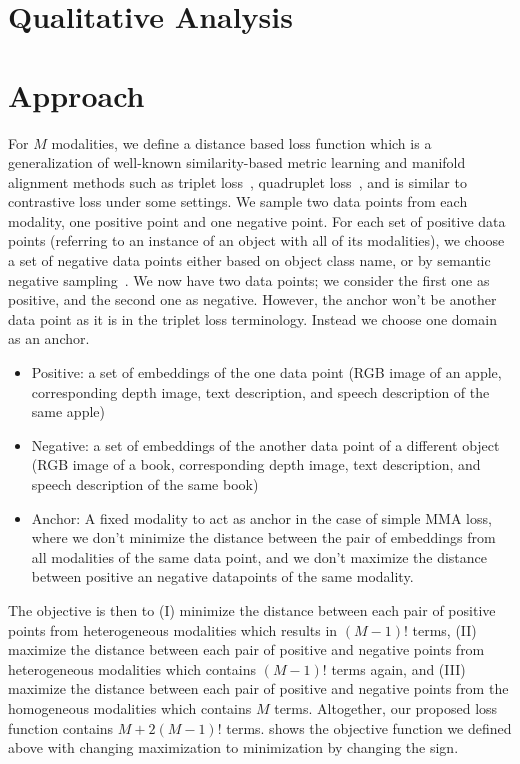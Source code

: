 
\section{Qualitative Analysis}
\section{Approach}

For $M$ modalities, we define a distance based loss function which is a generalization of well-known similarity-based metric learning and manifold alignment methods such as triplet loss~\cite{Carvalho-cooking-triplet,triplet_loss_2021_CVPR}, quadruplet loss~\cite{chen2017beyond}, and is similar to contrastive loss under some settings.
We sample two data points from each modality, one positive point and one negative point. 
For each set of positive data points (referring to an instance of an object with all of its modalities), we choose a set of negative data points either based on object class name, or by semantic negative sampling~\cite{Pillai_Matuszek_2018}. We now have two data points; we consider the first one as positive, and the second one as negative. However, the anchor won't be another data point as it is in the triplet loss terminology. Instead we choose one domain as an anchor. 

\begin{itemize}
    \item Positive: a set of embeddings of the one data point (RGB image of an apple, corresponding depth image, text description, and speech description of the same apple)
    \item Negative: a set of embeddings of the another data point of a different object (RGB image of a book, corresponding depth image, text description, and speech description of the same book)
    \item Anchor: A fixed modality to act as anchor in the case of simple MMA loss, where we don't minimize the distance between the pair of embeddings from all modalities of the same data point, and we don't maximize the distance between positive an negative datapoints of the same modality.
\end{itemize}

The objective is then to (I) minimize the distance between each pair of positive points from heterogeneous modalities which results in $(M-1)!$ terms, (II) maximize the distance between each pair of positive and negative points from heterogeneous modalities which contains $(M-1)!$ terms again, and (III) maximize the distance between each pair of positive and negative points from the homogeneous modalities which contains $M$ terms. Altogether, our proposed loss function contains $M+2(M-1)!$ terms.
 shows the objective function we defined above with changing maximization to minimization by changing the sign.

